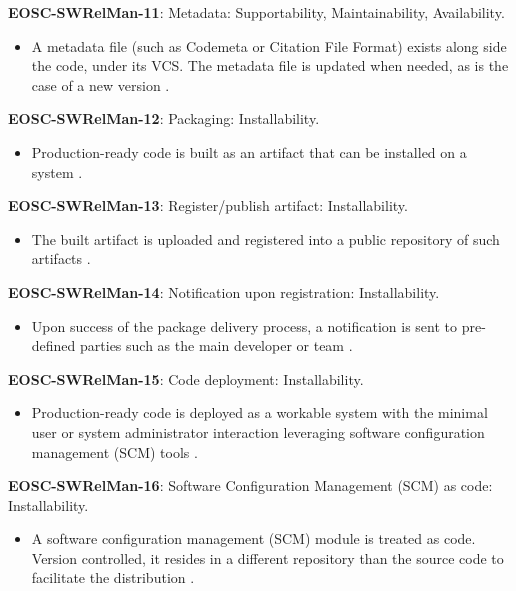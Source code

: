 \textbf{EOSC-SWRelMan-11}: Metadata: Supportability, Maintainability, Availability.

\begin{itemize}
    \item A metadata file (such as Codemeta or Citation File Format) exists along side the code, under its VCS. The metadata file is updated when needed, as is the case of a new version \cite{orviz_set_2017}.
\end{itemize}

\textbf{EOSC-SWRelMan-12}: Packaging: Installability.

\begin{itemize}
    \item Production-ready code is  built as an artifact that can be installed on a system \cite{shepherdson_cessda_2019,orviz_set_2017,raymond_software_2013}.
\end{itemize}

\textbf{EOSC-SWRelMan-13}: Register/publish artifact: Installability.

\begin{itemize}
    \item The built artifact is uploaded and registered into a public repository of such artifacts \cite{orviz_set_2017}.
\end{itemize}

\textbf{EOSC-SWRelMan-14}: Notification upon registration: Installability.

\begin{itemize}
    \item Upon success of the package delivery process, a notification is sent to pre-defined parties such as the main developer or team \cite{orviz_set_2017}.
\end{itemize}

\textbf{EOSC-SWRelMan-15}: Code deployment: Installability.

\begin{itemize}
    \item Production-ready code is deployed as a workable system with the minimal user or system administrator interaction leveraging software configuration management (SCM) tools \cite{orviz_set_2017}.
\end{itemize}

\textbf{EOSC-SWRelMan-16}: Software Configuration Management (SCM) as code: Installability.

\begin{itemize}
    \item A software configuration management (SCM) module is treated as code. Version controlled, it resides in a different repository than the source code to facilitate the distribution \cite{orviz_set_2017}.
\end{itemize}

